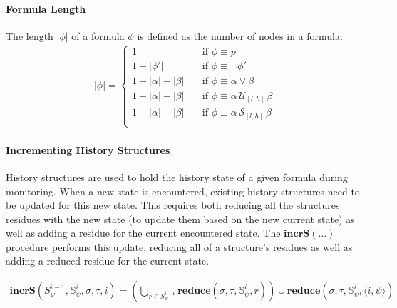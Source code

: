 \documentclass[]{../llncs/llncs}
\newcommand{\rp}[2]{\ensuremath{\langle #1, #2 \rangle}}
\begin{document}
\paragraph{Formula Length}
The length $|\phi|$ of a formula $\phi$ is defined as the number of nodes in a formula: 
\begin{align*}
|\phi| = \left\lbrace
\begin{aligned}
1 & \quad \text{if } \phi \equiv p \\
1 + |\phi'| & \quad \text{if } \phi \equiv \neg \phi' \\
1 + |\alpha| + |\beta| & \quad \text{if } \phi \equiv \alpha \vee \beta \\
1 + |\alpha| + |\beta| & \quad \text{if } \phi \equiv \alpha\, \mathcal{U}_{[l,h]}\, \beta \\
1 + |\alpha| + |\beta| & \quad \text{if } \phi \equiv \alpha\, \mathcal{S}_{[l,h]}\, \beta \\
\end{aligned} \right.
\end{align*}



\paragraph{Incrementing History Structures}
History structures are used to hold the history state of a given formula during monitoring.
When a new state is encountered, existing history structures need to be updated for this new state. This requires both reducing all the structures residues with the new state (to update them based on the new current state) as well as adding a residue for the current encountered state. The $\mathbf{incrS}(\dots)$ procedure performs this update, reducing all of a structure's residues as well as adding a reduced residue for the current state.

\begin{align*}
\mathbf{incrS}(S^{i-1}_\psi, \mathbb{S}^i_{\psi}, \sigma, \tau, i) = %
\left(\bigcup\limits_{r \in S^{i-1}_{\psi}} \mathbf{reduce}(\sigma, \tau, \mathbb{S}^i_{\psi}, r)\right) \cup \mathbf{reduce}(\sigma, \tau, \mathbb{S}^i_{\psi}, \rp{i}{\psi})
\end{align*}
\end{document}
